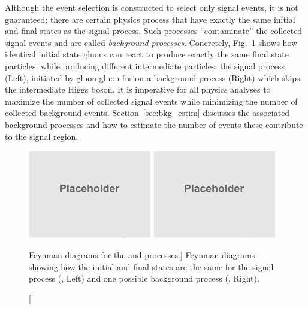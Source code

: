 Although the event selection is constructed to select only signal events, it is not guaranteed;
there are certain physics process that have exactly the same initial and final states as the signal process.
Such processes ``contaminate'' the collected signal events and are called \emph{background processes}.
Concretely, Fig.~\ref{fig:feyndiag_sig_vs_bkg} shows how identical initial state gluons can react to produce exactly the same final state particles, while producing different intermediate particles:
the signal process (Left), initiated by gluon-gluon fusion \vs a background process (Right) which skips the intermediate Higgs boson.
It is imperative for all physics analyses to maximize the number of collected signal events while minimizing the number of collected background events.
Section~\ref{sec:bkg_estim} discusses the associated background processes and how to estimate the number of events these contribute to the signal region.
\begin{figure}[!htbp]
	\begin{center}
		\includegraphics[width=0.48\textwidth]{figures/placeholder.png}  %
		\includegraphics[width=0.48\textwidth]{figures/placeholder.png}  %
		\caption
			[Feynman diagrams for the \gghzzfourl and \ggzzstarfourl processes.]
			{
            Feynman diagrams showing how the initial and final states are the same
            for the signal process (\gghzzfourl, Left) and one possible background process (\ggzzstarfourl, Right).
			}
		\label{fig:feyndiag_sig_vs_bkg}
	\end{center}
\end{figure}

